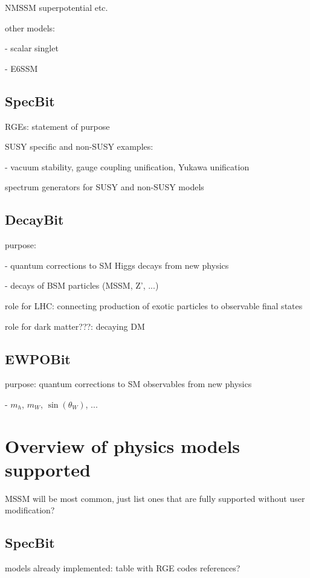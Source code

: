 \documentclass[11pt,a4paper]{article}
\begin{document}
NMSSM superpotential etc.

other models:

- scalar singlet

- E6SSM


\subsection{SpecBit}

RGEs: statement of purpose

SUSY specific and non-SUSY examples:

- vacuum stability, gauge coupling unification, Yukawa unification

spectrum generators for SUSY and non-SUSY models
 
 
\subsection{DecayBit}

purpose: 

- quantum corrections to SM Higgs decays from new physics

- decays of BSM particles (MSSM, Z', ...)

role for LHC: connecting production of exotic particles to observable final states

role for dark matter???: decaying DM


\subsection{EWPOBit}

purpose: quantum corrections to SM observables from new physics

- $m_h$, $m_W$, $\sin(\theta_W)$, ...


\section{Overview of physics models supported}

MSSM will be most common, just list ones that are fully supported without user modification?

\subsection{SpecBit}

models already implemented: table with RGE codes references?
\end{document}
